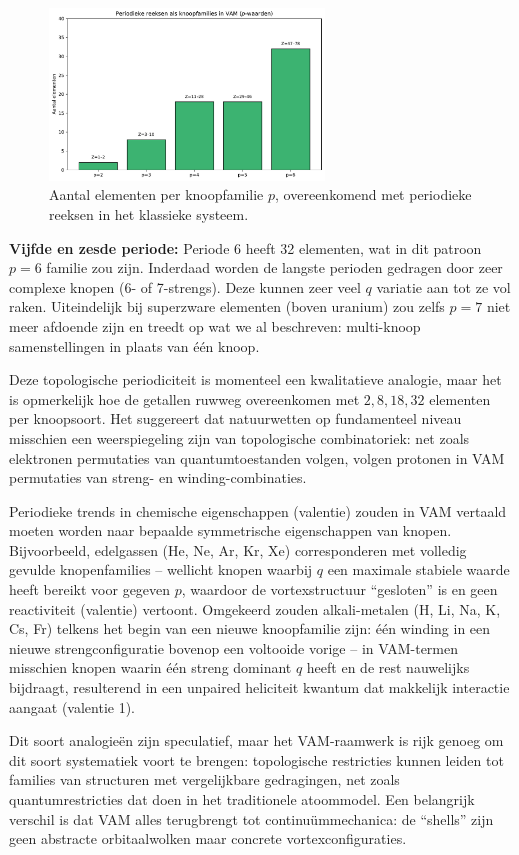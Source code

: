 \begin{figure}[H]
    \centering
    \includegraphics[width=0.65\textwidth]{../4_KnoopFamilies}
    \caption{Aantal elementen per knoopfamilie $p$, overeenkomend met periodieke reeksen in het klassieke systeem.}
    \label{fig:knoopfamilies}
\end{figure}

\textbf{Vijfde en zesde periode:} Periode 6 heeft 32 elementen, wat in dit patroon $p=6$ familie zou zijn. Inderdaad worden de langste perioden gedragen door zeer complexe knopen (6- of 7-strengs). Deze kunnen zeer veel $q$ variatie aan tot ze vol raken. Uiteindelijk bij superzware elementen (boven uranium) zou zelfs $p=7$ niet meer afdoende zijn en treedt op wat we al beschreven: multi-knoop samenstellingen in plaats van één knoop.

Deze topologische periodiciteit is momenteel een kwalitatieve analogie, maar het is opmerkelijk hoe de getallen ruwweg overeenkomen met $2, 8, 18, 32$ elementen per knoopsoort. Het suggereert dat natuurwetten op fundamenteel niveau misschien een weerspiegeling zijn van topologische combinatoriek: net zoals elektronen permutaties van quantumtoestanden volgen, volgen protonen in VAM permutaties van streng- en winding-combinaties.

Periodieke trends in chemische eigenschappen (valentie) zouden in VAM vertaald moeten worden naar bepaalde symmetrische eigenschappen van knopen. Bijvoorbeeld, edelgassen (He, Ne, Ar, Kr, Xe) corresponderen met volledig gevulde knopenfamilies – wellicht knopen waarbij $q$ een maximale stabiele waarde heeft bereikt voor gegeven $p$, waardoor de vortexstructuur “gesloten” is en geen reactiviteit (valentie) vertoont. Omgekeerd zouden alkali-metalen (H, Li, Na, K, Cs, Fr) telkens het begin van een nieuwe knoopfamilie zijn: één winding in een nieuwe strengconfiguratie bovenop een voltooide vorige – in VAM-termen misschien knopen waarin één streng dominant $q$ heeft en de rest nauwelijks bijdraagt, resulterend in een unpaired heliciteit kwantum dat makkelijk interactie aangaat (valentie 1).

Dit soort analogieën zijn speculatief, maar het VAM-raamwerk is rijk genoeg om dit soort systematiek voort te brengen: topologische restricties kunnen leiden tot families van structuren met vergelijkbare gedragingen, net zoals quantumrestricties dat doen in het traditionele atoommodel. Een belangrijk verschil is dat VAM alles terugbrengt tot continuümmechanica: de “shells” zijn geen abstracte orbitaalwolken maar concrete vortexconfiguraties.
